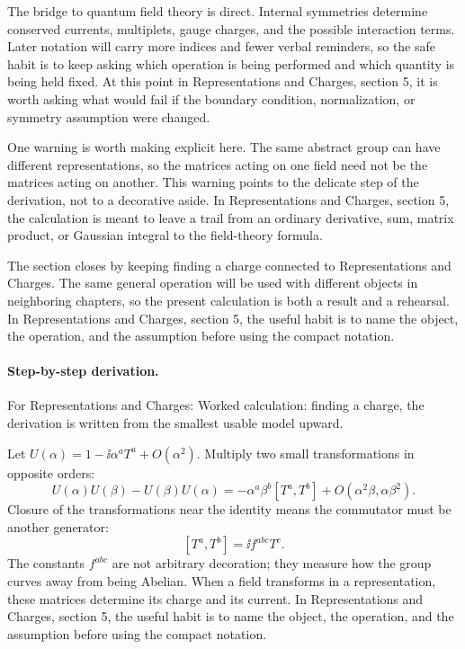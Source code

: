 The bridge to quantum field theory is direct.  Internal symmetries determine conserved currents, multiplets, gauge charges, and the possible interaction terms.  Later notation will carry more indices and fewer verbal reminders, so the safe habit is to keep asking which operation is being performed and which quantity is being held fixed.  At this point in Representations and Charges, section 5, it is worth asking what would fail if the boundary condition, normalization, or symmetry assumption were changed.

One warning is worth making explicit here.  The same abstract group can have different representations, so the matrices acting on one field need not be the matrices acting on another.  This warning points to the delicate step of the derivation, not to a decorative aside.  In Representations and Charges, section 5, the calculation is meant to leave a trail from an ordinary derivative, sum, matrix product, or Gaussian integral to the field-theory formula.

The section closes by keeping finding a charge connected to Representations and Charges.  The same general operation will be used with different objects in neighboring chapters, so the present calculation is both a result and a rehearsal.  In Representations and Charges, section 5, the useful habit is to name the object, the operation, and the assumption before using the compact notation.



\paragraph{Step-by-step derivation.}

For Representations and Charges: Worked calculation: finding a charge, the derivation is written from the smallest usable model upward.

Let \(U(\alpha)=1-\ii\alpha^aT^a+O(\alpha^2)\).  Multiply two small transformations in opposite orders:
\[
  U(\alpha)U(\beta)-U(\beta)U(\alpha)
  =
  -\alpha^a\beta^b[T^a,T^b]+O(\alpha^2\beta,\alpha\beta^2).
\]
Closure of the transformations near the identity means the commutator must be another generator:
\[
  [T^a,T^b]=\ii f^{abc}T^c.
\]
The constants \(f^{abc}\) are not arbitrary decoration; they measure how the group curves away from being Abelian.  When a field transforms in a representation, these matrices determine its charge and its current.  In Representations and Charges, section 5, the useful habit is to name the object, the operation, and the assumption before using the compact notation.

